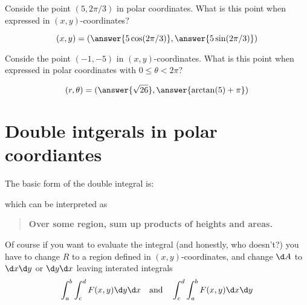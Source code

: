\documentclass{ximera}
\begin{document}
\begin{question}
  Conside the point $(5, 2\pi/3)$ in polar coordinates. What is this
  point when expressed in $(x,y)$-coordinates?
  \begin{prompt}
    \[
    (x,y) = (\answer{5\cos(2\pi/3)}, \answer{5 \sin(2\pi/3)})
    \]
  \end{prompt}
  \begin{question}
    Conside the point $(-1, -5)$ in $(x,y)$-coordinates. What is this
    point when expressed in polar coordinates with $0\le\theta<2\pi$?
    \begin{prompt}
      \[
      (r,\theta) = (\answer{\sqrt{26}}, \answer{\arctan(5)+\pi})
      \]
    \end{prompt}
  \end{question}
\end{question}

\section{Double intgerals in polar coordiantes}

The basic form of the double integral is:
\begin{image}
\end{image}
which can be interpreted as
\begin{quote}
  \textbf{Over \textcolor{red!50!black}{some region},
    \textcolor{green!70!black!70!blue}{sum up} products of
    \textcolor{purple!50!blue!90!black}{heights} and \textcolor{blue!70!green}{areas}.}
\end{quote}
Of course if you want to evaluate the integral (and honestly, who
doesn't?) you have to change $R$ to a region defined in $(x,y)$-coordinates,
and change $\d A$ to $\d x\d y$ or $\d y\d x$ leaving interated integrals
\[
\int_a^b\int_c^d F(x,y) \d y \d x\quad\text{and}\quad \int_c^d \int_a^b F(x,y) \d x\d y
\]
\end{document}
